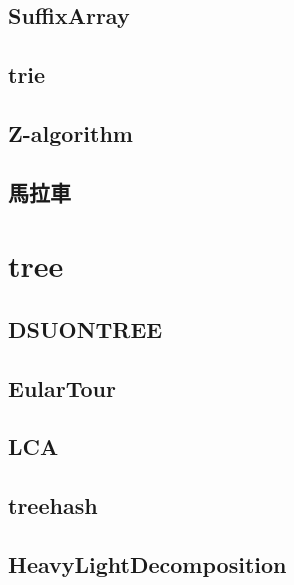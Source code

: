 \documentclass[a4paper,10pt,twocolumn,oneside]{article}
\begin{document}
    \subsection{SuffixArray}
    

    \subsection{trie}
    

    \subsection{Z-algorithm}
    

    \subsection{馬拉車}
    

\section{tree}
    \subsection{DSUONTREE}
    

    \subsection{EularTour}
    

    \subsection{LCA}
    

    \subsection{treehash}
    

    \subsection{HeavyLightDecomposition}
    
\end{document}

